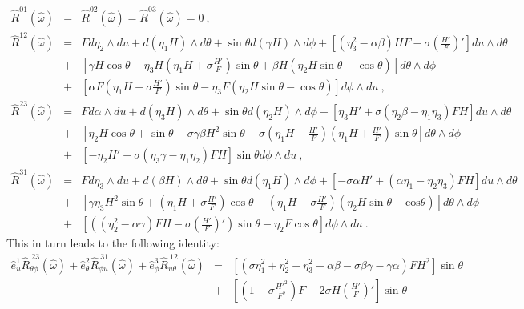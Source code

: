 \documentclass[preprint,aps,superscriptaddress,nofootinbib]{revtex4-1}
\begin{document}
\begin{eqnarray}\label{RK}
\hat{R}^{01}(\hat{\omega})&=& \hat{R}^{02}(\hat{\omega})=\hat{R}^{03}
(\hat{\omega})=0~,\nonumber\\
\hat{R}^{12}(\hat{\omega})&=& Fd\eta_2\wedge du+d\left(\eta_1 
H\right)\wedge d\theta
+\sin\theta d(\gamma H)\wedge d\phi 
%
+\left[(\eta_3^2-\alpha\beta)HF -\sigma\left(\frac{H'}
{F}\right)'\right]du\wedge d\theta\nonumber\\
%
&+&\left[\gamma H \cos\theta- \eta_3 H\left(\eta_1 H+\sigma\frac{H'}
{F}\right)\sin\theta+\beta H (\eta_2 
H\sin\theta-\cos\theta)\right]d\theta\wedge d \phi\nonumber\\
%
&+&\left[\alpha F\left(\eta_1 H+\sigma\frac{H'}{F}\right)\sin\theta-\eta_3 
F(\eta_2 H\sin\theta-\cos\theta)\right]d\phi\wedge du~,\nonumber\\
%
\hat{R}^{23}(\hat{\omega})&=& F d\alpha\wedge du+d(\eta_3 H)\wedge d\theta
+\sin\theta d(\eta_2 H)\wedge d\phi +
\left[\eta_3 H'+\sigma(\eta_2 \beta-\eta_1 \eta_3) FH\right]du\wedge 
d\theta\nonumber\\
&+&\left[\eta_2 H\cos\theta+\sin\theta- \sigma\gamma\beta 
H^2\sin\theta+\sigma\left(\eta_1 H-\frac{H'}{F}\right)\left(\eta_1 
H+\frac{H'}{F}\right)\sin\theta\right]d\theta\wedge d\phi\nonumber\\
%
&+&\left[-\eta_2 H'+\sigma(\eta_3\gamma-\eta_1 \eta_2) FH\right]\sin\theta 
d\phi\wedge du~,\nonumber\\
%
%
\hat{R}^{31}(\hat{\omega})&=& F d\eta_3\wedge du+d(\beta H)\wedge d\theta
+\sin\theta d(\eta_1 H)\wedge d\phi +
%
\left[-\sigma\alpha H'+(\alpha \eta_1-\eta_2\eta_3) FH \right]du\wedge 
d\theta\nonumber\\
%
&+&\left[\gamma\eta_3 H^2 \sin\theta+\left(\eta_1 H+\sigma\frac{H'}
{F}\right)\cos\theta-\left(\eta_1 H-
\sigma\frac{H'}{F}\right)\left(\eta_2 H 
\sin\theta-\mathrm{cos}\theta\right)\right]d\theta\wedge d\phi\nonumber\\
%
&+&\left[\left((\eta_2^2-\alpha\gamma) FH -\sigma\left(\frac{H'}
{F}\right)'\right)\sin\theta- \eta_2 F \cos\theta\right]d\phi\wedge du~.
\end{eqnarray}
This in turn leads to the following identity:
\begin{eqnarray}
\hat{e}_{u}^{1} \hat{R}_{\theta\phi}^{~23}
(\hat{\omega})+\hat{e}_{\theta}^{2} \hat{R}_{\phi u}^{~31}
(\hat{\omega})+\hat{e}_{\phi}^{3} \hat{R}_{u\theta}^{~12}
(\hat{\omega})&=&\left[(\sigma\eta_1^2+\eta_2^2+\eta_3^2-\alpha\beta-\sigma\beta\gamma-
\gamma\alpha)FH^2\right]\sin\theta\nonumber\\
&+&\left[\left(1-\sigma\frac{H'^2}{F^2}\right)F-2\sigma H\left(\frac{H'}
{F}\right)'\right]\sin\theta
\end{eqnarray}
\end{document}
